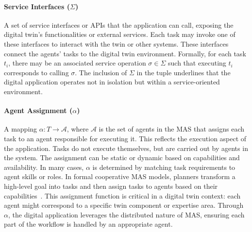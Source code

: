 \paragraph{Service Interfaces ($\Sigma$)} A set of service interfaces or APIs that the application can call, exposing the digital twin’s functionalities or external services. Each task may invoke one of these interfaces to interact with the twin or other systems. These interfaces connect the agents’ tasks to the digital twin environment. Formally, for each task $t_i$, there may be an associated service operation $\sigma \in \Sigma$ such that executing $t_i$ corresponds to calling $\sigma$. The inclusion of $\Sigma$ in the tuple underlines that the digital application operates not in isolation but within a service-oriented environment. 

\paragraph{Agent Assignment ($\alpha$)} A mapping $\alpha : T \rightarrow \mathcal{A}$, where $\mathcal{A}$ is the set of agents in the MAS that assigns each task to an agent responsible for executing it. This reflects the execution aspect of the application. Tasks do not execute themselves, but are carried out by agents in the system. The assignment can be static or dynamic based on capabilities and availability. In many cases, $\alpha$ is determined by matching task requirements to agent skills or roles. In formal cooperative MAS models, planners transform a high-level goal into tasks and then assign tasks to agents based on their capabilities~\cite{Kotb_WorkflowNetCooperative}. This assignment function is critical in a digital twin context: each agent might correspond to a specific twin component or expertise area. Through $\alpha$, the digital application leverages the distributed nature of MAS, ensuring each part of the workflow is handled by an appropriate agent.

